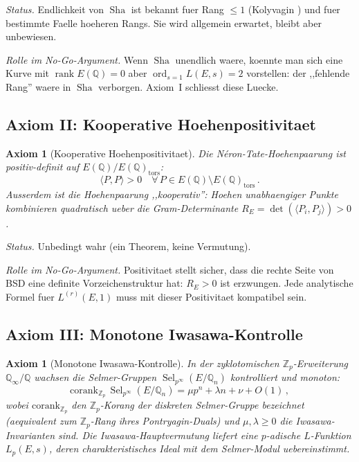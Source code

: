 \documentclass[aps,prd,twocolumn,superscriptaddress,nofootinbib]{revtex4-2}
\newtheorem{axiom}[theorem]{Axiom}
\theoremstyle{definition}
\theoremstyle{remark}
\DeclareMathOperator{\ord}{ord}
\DeclareMathOperator{\rank}{rank}
\DeclareMathOperator{\Sel}{Sel}
\DeclareMathOperator{\Sha}{Sha}
\begin{document}
\textit{Status.} Endlichkeit von $\Sha$ ist bekannt fuer Rang $\leq 1$ (Kolyvagin \cite{Kolyvagin1990}) und fuer bestimmte Faelle hoeheren Rangs. Sie wird allgemein erwartet, bleibt aber unbewiesen.

\textit{Rolle im No-Go-Argument.} Wenn $\Sha$ unendlich waere, koennte man sich eine Kurve mit $\rank E(\mathbb{Q}) = 0$ aber $\ord_{s=1} L(E,s) = 2$ vorstellen: der ,,fehlende Rang'' waere in $\Sha$ verborgen. Axiom~I schliesst diese Luecke.

\subsection{Axiom II: Kooperative Hoehenpositivitaet}

\begin{axiom}[Kooperative Hoehenpositivitaet]
\label{ax:positivity}
Die N\'eron-Tate-Hoehenpaarung ist positiv-definit auf $E(\mathbb{Q})/E(\mathbb{Q})_{\mathrm{tors}}$:
\begin{equation}
\langle P, P \rangle > 0 \quad \forall\, P \in E(\mathbb{Q}) \setminus E(\mathbb{Q})_{\mathrm{tors}}\,.
\end{equation}
Ausserdem ist die Hoehenpaarung ,,kooperativ'': Hoehen unabhaengiger Punkte kombinieren quadratisch ueber die Gram-Determinante $R_E = \det(\langle P_i, P_j \rangle) > 0$.
\end{axiom}

\textit{Status.} Unbedingt wahr (ein Theorem, keine Vermutung).

\textit{Rolle im No-Go-Argument.} Positivitaet stellt sicher, dass die rechte Seite von BSD eine definite Vorzeichenstruktur hat: $R_E > 0$ ist erzwungen. Jede analytische Formel fuer $L^{(r)}(E,1)$ muss mit dieser Positivitaet kompatibel sein.

\subsection{Axiom III: Monotone Iwasawa-Kontrolle}

\begin{axiom}[Monotone Iwasawa-Kontrolle]
\label{ax:iwasawa}
In der zyklotomischen $\mathbb{Z}_p$-Erweiterung $\mathbb{Q}_\infty/\mathbb{Q}$ wachsen die Selmer-Gruppen $\Sel_{p^\infty}(E/\mathbb{Q}_n)$ kontrolliert und monoton:
\begin{equation}
\mathrm{corank}_{\mathbb{Z}_p}\, \Sel_{p^\infty}(E/\mathbb{Q}_n) = \mu p^n + \lambda n + \nu + O(1)\,,
\label{eq:iwasawa_growth}
\end{equation}
wobei $\mathrm{corank}_{\mathbb{Z}_p}$ den $\mathbb{Z}_p$-Korang der diskreten Selmer-Gruppe bezeichnet (aequivalent zum $\mathbb{Z}_p$-Rang ihres Pontryagin-Duals) und $\mu, \lambda \geq 0$ die Iwasawa-Invarianten sind. Die Iwasawa-Hauptvermutung liefert eine $p$-adische $L$-Funktion $L_p(E,s)$, deren charakteristisches Ideal mit dem Selmer-Modul uebereinstimmt.
\end{axiom}
\end{document}
